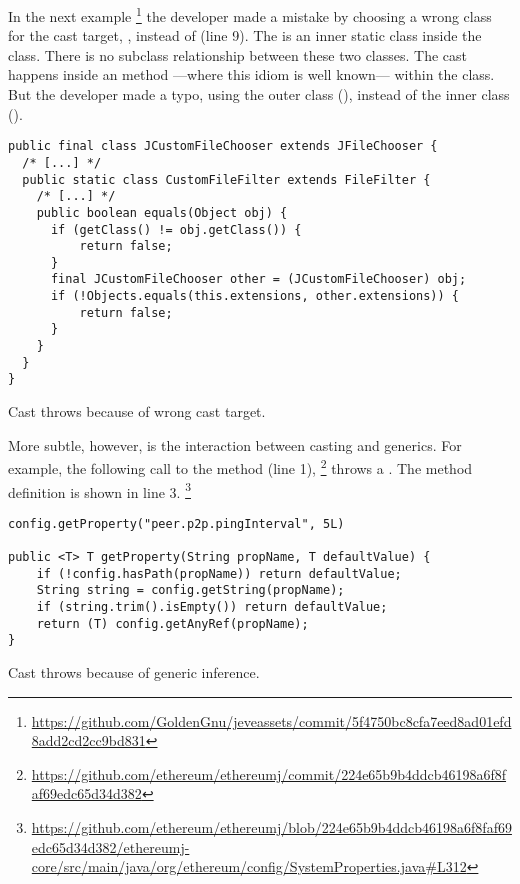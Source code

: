 In the next example%
\footnote{\url{https://github.com/GoldenGnu/jeveassets/commit/5f4750bc8cfa7eed8ad01efd8add2cd2cc9bd831}}
the developer made a mistake by choosing a wrong class for the cast target,
\ie,  instead of  (line 9).
The  is an inner static class inside the  class.
There is no subclass relationship between these two classes.
The cast happens inside an  method
---where this idiom is well known---
within the  class.
But the developer made a typo, using the outer class (), instead of the inner class ().

\begin{listing}
\begin{verbatim}
public final class JCustomFileChooser extends JFileChooser {
  /* [...] */
  public static class CustomFileFilter extends FileFilter {
    /* [...] */
    public boolean equals(Object obj) {
      if (getClass() != obj.getClass()) {
          return false;
      }
      final JCustomFileChooser other = (JCustomFileChooser) obj;
      if (!Objects.equals(this.extensions, other.extensions)) {
          return false;
      }
    }
  }
}
\end{verbatim} 
\caption{Cast throws  because of wrong cast target.}
\end{listing}

More subtle, however, is the interaction between casting and generics.
For example, the following call to the  method (line 1),%
\footnote{\url{https://github.com/ethereum/ethereumj/commit/224e65b9b4ddcb46198a6f8faf69edc65d34d382}}
throws a .
The method definition is shown in line 3.%
\footnote{\url{https://github.com/ethereum/ethereumj/blob/224e65b9b4ddcb46198a6f8faf69edc65d34d382/ethereumj-core/src/main/java/org/ethereum/config/SystemProperties.java\#L312}}

\begin{listing}
\begin{verbatim}
config.getProperty("peer.p2p.pingInterval", 5L)

public <T> T getProperty(String propName, T defaultValue) {
    if (!config.hasPath(propName)) return defaultValue;
    String string = config.getString(propName);
    if (string.trim().isEmpty()) return defaultValue;
    return (T) config.getAnyRef(propName);
}
\end{verbatim}
\caption{Cast throws  because of generic inference.}
\end{listing}

